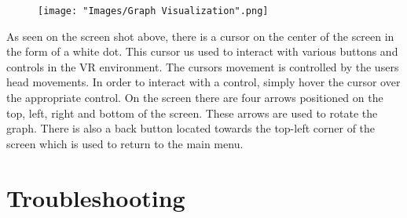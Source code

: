 \documentclass[english]{article}
\begin{document}
\begin{figure}
  \centering
  \texttt{[image: "Images/Graph Visualization".png]}
\end{figure}

\begin{flushleft}
As seen on the screen shot above, there is a cursor on the center of the screen in the form of a white dot. This cursor us used to interact with various buttons and controls in the VR environment. The cursors movement is controlled by the users head movements. In order to interact with a control, simply hover the cursor over the appropriate control. On the screen there are four arrows positioned on the top, left, right and bottom of the screen. These arrows are used to rotate the graph. There is also a back button located towards the top-left corner of the screen which is used to return to the main menu.
\end{flushleft}
\section{Troubleshooting}
\end{document}
